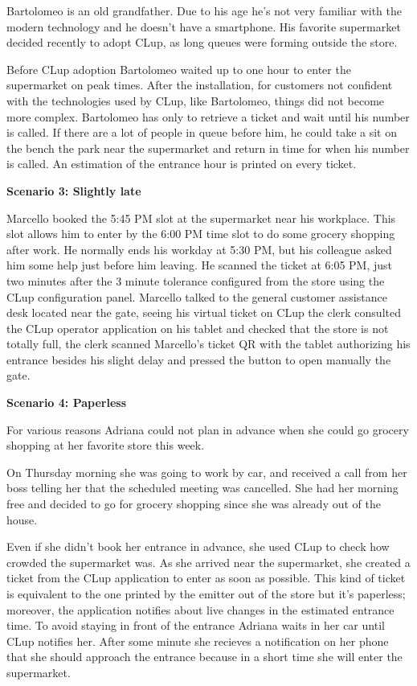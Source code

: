 Bartolomeo is an old grandfather. Due to his age he's not very familiar with the modern technology and he doesn't have a smartphone. His favorite supermarket decided recently to adopt CLup, as long queues were forming outside the store.

\smallskip

Before CLup adoption Bartolomeo waited up to one hour to enter the supermarket on peak times. After the installation, for customers not confident with the technologies used by CLup, like Bartolomeo, things did not become more complex. Bartolomeo has only to retrieve a ticket and wait until his number is called. If there are a lot of people in queue before him, he could take a sit on the bench the park near the supermarket and return in time for when his number is called. An estimation of the entrance hour is printed on every ticket.

\medskip

\textbf{Scenario 3: Slightly late}

Marcello booked the 5:45 PM slot at the supermarket near his workplace. This slot allows him to enter by the 6:00 PM time slot to do some grocery shopping after work. He normally ends his workday at 5:30 PM, but his colleague asked him some help just before him leaving. He scanned the ticket at 6:05 PM, just two minutes after the 3 minute tolerance configured from the store using the CLup configuration panel. Marcello talked to the general customer assistance desk located near the gate, seeing his virtual ticket on CLup the clerk consulted the CLup operator application on his tablet and checked that the store is not totally full, the clerk scanned Marcello's ticket QR with the tablet authorizing his entrance besides his slight delay and pressed the button to open manually the gate.

\medskip

\textbf{Scenario 4: Paperless}

For various reasons Adriana could not plan in advance when she could go grocery shopping at her favorite store this week.

\smallskip
On Thursday morning she was going to work by car, and received a call from her boss telling her that the scheduled meeting was cancelled. She had her morning free and decided to go for grocery shopping since she was already out of the house.

\smallskip

Even if she didn't book her entrance in advance, she used CLup to check how crowded the supermarket was. As she arrived near the supermarket, she created a ticket from the CLup application to enter as soon as possible. This kind of ticket is equivalent to the one printed by the emitter out of the store but it's paperless; moreover, the application notifies about live changes in the estimated entrance time. To avoid staying in front of the entrance Adriana waits in her car until CLup notifies her.
After some minute she recieves a notification on her phone that she should approach the entrance because in a short time she will enter the supermarket.

